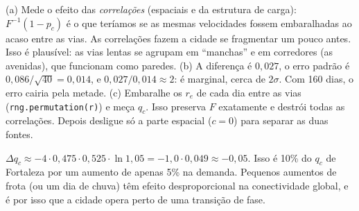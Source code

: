 \documentclass[11pt]{article}
\begin{document}
(a) Mede o efeito das \emph{correlações} (espaciais e da estrutura de carga): $F^{-1}(1-p_c)$ é o que teríamos se as mesmas velocidades fossem embaralhadas ao acaso entre as vias. As correlações fazem a cidade se fragmentar um pouco antes. Isso é plausível: as vias lentas se agrupam em ``manchas'' e em corredores (as avenidas), que funcionam como paredes. (b) A diferença é $0{,}027$, o erro padrão é $0{,}086/\sqrt{40} = 0{,}014$, e $0{,}027/0{,}014\approx2$: é marginal, cerca de $2\sigma$. Com 160 dias, o erro cairia pela metade. (c) Embaralhe os $r_e$ de cada dia entre as vias (\texttt{rng.permutation(r)}) e meça $q_c$. Isso preserva $F$ exatamente e destrói todas as correlações. Depois desligue só a parte espacial ($c=0$) para separar as duas fontes.

$\Delta q_c\approx-4\cdot0{,}475\cdot0{,}525\cdot\ln1{,}05 = -1{,}0\cdot0{,}049\approx-0{,}05$. Isso é 10\% do $q_c$ de Fortaleza por um aumento de apenas 5\% na demanda. Pequenos aumentos de frota (ou um dia de chuva) têm efeito desproporcional na conectividade global, e é por isso que a cidade opera perto de uma transição de fase.
\end{document}
